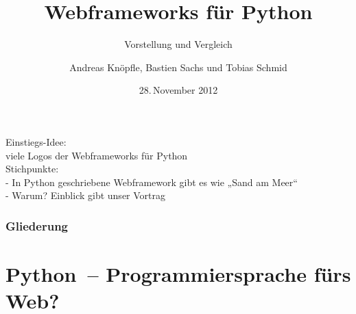 \documentclass[
    t,
    smaller,
    compress,
    xcolor=svgnames,            %
    table,
]{beamer}
\title{Webframeworks für Python}
\subtitle{Vorstellung und Vergleich}
\author{Andreas Knöpfle, Bastien Sachs und Tobias Schmid}
\institute{Institut für Informatik}
\date{28.\,November 2012}
\begin{document}
{
\begin{frame} %
    \titlepage
\end{frame}
}


\begin{frame}
  Einstiegs-Idee:\\
  viele Logos der Webframeworks für Python\\
  Stichpunkte:\\
   - In Python geschriebene Webframework gibt es wie „Sand am Meer“\\
   - Warum? Einblick gibt unser Vortrag\\

\end{frame}


\begin{frame}
  \frametitle{Gliederung}
  \tableofcontents
\end{frame}


\section{Python~-- Programmiersprache fürs Web?}
\end{document}
